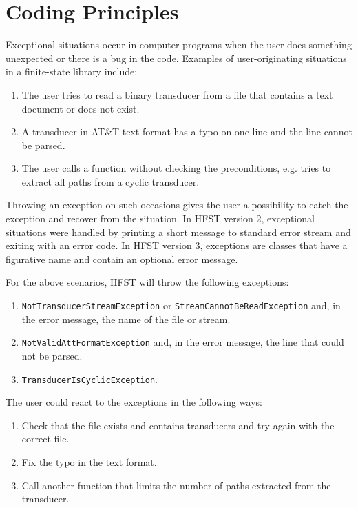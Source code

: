 \documentclass{llncs}
\begin{document}
\section{Coding Principles}

Exceptional situations occur in computer programs when the
user does something unexpected or there is a bug in the code.
Examples of user-originating situations in a finite-state library include:

\begin{enumerate} 
\item The user tries to read a binary transducer from a
file that contains a text document or does not exist.
\item A transducer in AT\&T text format has a typo on one line and the 
line cannot be parsed. 
\item The user calls a function without checking the preconditions,
e.g. tries to extract all paths from a cyclic transducer.
\end{enumerate}

Throwing an exception on such occasions gives the user a possibility
to catch the exception and recover from the situation. In HFST version
2, exceptional situations were handled by printing a short message
to standard error stream and exiting with an error code. In HFST version 3, 
exceptions are classes that have a figurative name and contain an 
optional error message.

For the above scenarios, HFST will throw the following exceptions:

\begin{enumerate} 
\item \texttt{NotTransducerStreamException} or 
\texttt{StreamCannotBeReadException} and, in the error message,
the name of the file or stream.
\item \texttt{NotValidAttFormatException} and, in the error message, 
the line that could not be parsed.
\item \texttt{TransducerIsCyclicException}.
\end{enumerate} 

The user could react to the exceptions in the following ways:

\begin{enumerate} 
\item Check that the file exists and contains transducers and try again
with the correct file.
\item Fix the typo in the text format.
\item Call another function that limits the number of paths extracted
from the transducer.
\end{enumerate} 
\end{document}
